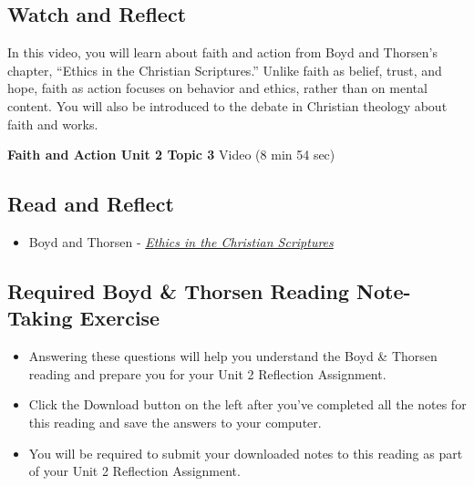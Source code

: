\documentclass[
]{book}
\providecommand{\tightlist}{%
  \setlength{\itemsep}{0pt}\setlength{\parskip}{0pt}}
\begin{document}
\hypertarget{watch-and-reflect-12}{%
\subsection*{Watch and Reflect}\label{watch-and-reflect-12}}

In this video, you will learn about faith and action from Boyd and Thorsen's chapter, ``Ethics in the Christian Scriptures.'' Unlike faith as belief, trust, and hope, faith as action focuses on behavior and ethics, rather than on mental content. You will also be introduced to the debate in Christian theology about faith and works.

\textbf{Faith and Action Unit 2 Topic 3} Video (8 min 54 sec)

\hypertarget{read-and-reflect-5}{%
\subsection*{Read and Reflect}\label{read-and-reflect-5}}

\begin{itemize}
\tightlist
\item
  Boyd and Thorsen - \href{assets/u2/PHIL-100-Boyd-and-Thorsen-Ethics-in-the-Christian-Scriptures.pdf}{\emph{Ethics in the Christian Scriptures}}
\end{itemize}

\hypertarget{required-boyd-thorsen-reading-note-taking-exercise}{%
\subsection*{Required Boyd \& Thorsen Reading Note-Taking Exercise}\label{required-boyd-thorsen-reading-note-taking-exercise}}

\begin{reflect}
\begin{itemize}
\tightlist
\item
  Answering these questions will help you understand the Boyd \& Thorsen reading and prepare you for your Unit 2 Reflection Assignment.
\item
  Click the Download button on the left after you've completed all the notes for this reading and save the answers to your computer.
\item
  You will be required to submit your downloaded notes to this reading as part of your Unit 2 Reflection Assignment.
\end{itemize}
\end{reflect}
\end{document}
